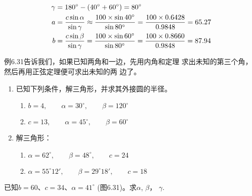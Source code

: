 \begin{figure}[htp]
    \centering
{}
    \caption{}
\end{figure}

\begin{solution}
\[\begin{split}
    \gamma&=180^{\circ}-(40^{\circ}+60^{\circ})=80^{\circ}\\
    a&=\dfrac{c\sin\alpha}{\sin\gamma}\approx \dfrac{100\times \sin 40^{\circ}}{\sin 80^{\circ}}=\dfrac{100\times 0.6428}{0.9848}=65.27\\
    b&=\dfrac{c\sin\beta}{\sin\gamma}=\dfrac{100\times \sin 60^{\circ}}{\sin 80^{\circ}}=\dfrac{100\times 0.8660}{0.9848}=87.94
\end{split}\]
\end{solution}

例6.31告诉我们，如果已知两角和一边，先用内角和定理
求出未知的第三个角，然后再用正弦定理便可求出未知的两
边了。

\begin{ex}
\begin{enumerate}
    \item 已知下列条件，解三角形，并求其外接圆的半径。
\begin{enumerate}
    \item $b=4,\qquad \alpha=30^{\circ} ,\qquad \beta=120^{\circ} $
    \item $c=13,\qquad \alpha=45^{\circ},\qquad \beta=60^{\circ} $
\end{enumerate}
    \item 解三角形：
\begin{enumerate}
    \item $\alpha=62^{\circ} ,\qquad \beta=48^{\circ} ,\qquad c=24$
    \item $\alpha=55^{\circ} 12',\qquad \beta=29^{\circ} 18',\qquad c=18$
\end{enumerate}
\end{enumerate}
\end{ex}


\begin{example}
    已知$b=60$、$c=34$、$\alpha=41^{\circ}$ (图6.31)。求$\alpha$, $\beta$，
$\gamma$.
\end{example}

\begin{figure}[htp]
    \centering
{}
    \caption{}
\end{figure}

